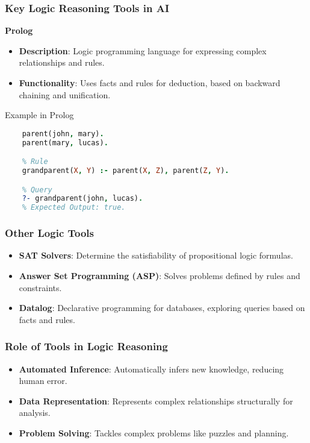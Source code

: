 \documentclass[aspectratio=169]{beamer}
\begin{document}
\begin{frame}
    \frametitle{Key Logic Reasoning Tools in AI}
    
    \textbf{Prolog}
    \begin{itemize}
        \item \textbf{Description}: Logic programming language for expressing complex relationships and rules.
        \item \textbf{Functionality}: Uses facts and rules for deduction, based on backward chaining and unification.
    \end{itemize}
    
    \begin{block}{Example in Prolog}
    \begin{lstlisting}[language=prolog]
    % Facts
    parent(john, mary).
    parent(mary, lucas).

    % Rule
    grandparent(X, Y) :- parent(X, Z), parent(Z, Y).

    % Query
    ?- grandparent(john, lucas).
    % Expected Output: true.
    \end{lstlisting}
    \end{block}
\end{frame}

\begin{frame}
    \frametitle{Other Logic Tools}
    \begin{itemize}
        \item \textbf{SAT Solvers}: Determine the satisfiability of propositional logic formulas.
        \item \textbf{Answer Set Programming (ASP)}: Solves problems defined by rules and constraints.
        \item \textbf{Datalog}: Declarative programming for databases, exploring queries based on facts and rules.
    \end{itemize}
\end{frame}

\begin{frame}
    \frametitle{Role of Tools in Logic Reasoning}
    \begin{itemize}
        \item \textbf{Automated Inference}: Automatically infers new knowledge, reducing human error.
        \item \textbf{Data Representation}: Represents complex relationships structurally for analysis.
        \item \textbf{Problem Solving}: Tackles complex problems like puzzles and planning.
    \end{itemize}
\end{frame}
\end{document}
